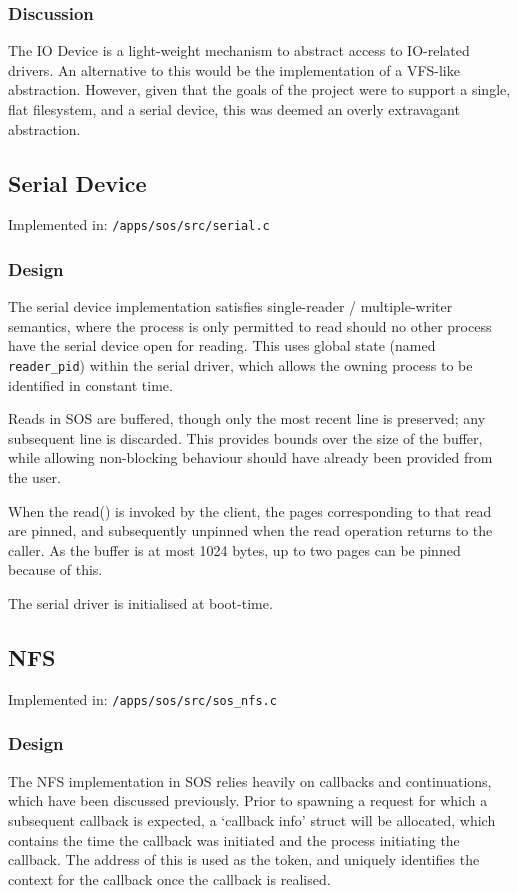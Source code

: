 \documentclass[a4paper,12pt]{article}
\begin{document}
\subsubsection{Discussion}
The IO Device is a light-weight mechanism to abstract access to IO-related
drivers.  An alternative to this would be the implementation of a VFS-like
abstraction.  However, given that the goals of the project were to support a
single, flat filesystem, and a serial device, this was deemed an overly
extravagant abstraction.

\subsection{Serial Device}
Implemented in: \texttt{/apps/sos/src/serial.c}

\subsubsection{Design}
The serial device implementation satisfies single-reader / multiple-writer
semantics, where the process is only permitted to read should no other process
have the serial device open for reading.  This uses global state (named
\texttt{reader\_pid}) within the serial driver, which allows the owning process to be
identified in constant time.

Reads in SOS are buffered, though only the most recent line is preserved; any
subsequent line is discarded.  This provides bounds over the size of the
buffer, while allowing non-blocking behaviour should have already been
provided from the user.

When the read() is invoked by the client, the pages corresponding to that read
are pinned, and subsequently unpinned when the read operation returns to the
caller.  As the buffer is at most 1024 bytes, up to two pages can be pinned
because of this.

The serial driver is initialised at boot-time.

\subsection{NFS}
Implemented in: \texttt{/apps/sos/src/sos\_nfs.c}

\subsubsection{Design}
The NFS implementation in SOS relies heavily on callbacks and continuations,
which have been discussed previously.  Prior to spawning a request for which a
subsequent callback is expected, a `callback info' struct will be allocated,
which contains the time the callback was initiated and the process initiating
the callback.  The address of this is used as the token, and uniquely
identifies the context for the callback once the callback is realised.
\end{document}
